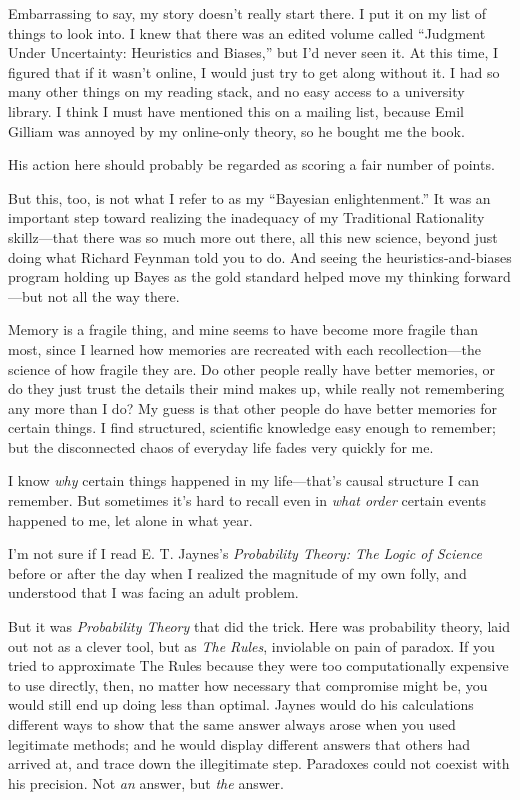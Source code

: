{
 Embarrassing to say, my story doesn't really start
there. I put it on my list of things to look into. I knew that there
was an edited volume called ``Judgment Under
Uncertainty: Heuristics and Biases,'' but
I'd never seen it. At this time, I figured that if it
wasn't online, I would just try to get along without
it. I had so many other things on my reading stack, and no easy access
to a university library. I think I must have mentioned this on a
mailing list, because Emil Gilliam was annoyed by my online-only
theory, so he bought me the book.}

{
 His action here should probably be regarded as scoring a fair
number of points.}

{
 But this, too, is not what I refer to as my
``Bayesian enlightenment.'' It was
an important step toward realizing the inadequacy of my Traditional
Rationality skillz---that there was so much more out there, all this
new science, beyond just doing what Richard Feynman told you to do. And
seeing the heuristics-and-biases program holding up Bayes as the gold
standard helped move my thinking forward---but not all the way there.}

{
 Memory is a fragile thing, and mine seems to have become more
fragile than most, since I learned how memories are recreated with each
recollection---the science of how fragile they are. Do other people
really have better memories, or do they just trust the details their
mind makes up, while really not remembering any more than I do? My
guess is that other people do have better memories for certain things.
I find structured, scientific knowledge easy enough to remember; but
the disconnected chaos of everyday life fades very quickly for me.}

{
 I know \textit{why} certain things happened in my
life---that's causal structure I can remember. But
sometimes it's hard to recall even in \textit{what
order} certain events happened to me, let alone in what year.}

{
 I'm not sure if I read E. T.
Jaynes's \textit{Probability Theory: The Logic of
Science} before or after the day when I realized the magnitude of my
own folly, and understood that I was facing an adult problem.}

{
 But it was \textit{Probability Theory} that did the trick. Here
was probability theory, laid out not as a clever tool, but as
\textit{The Rules}, inviolable on pain of paradox. If you tried to
approximate The Rules because they were too computationally expensive
to use directly, then, no matter how necessary that compromise might
be, you would still end up doing less than optimal. Jaynes would do his
calculations different ways to show that the same answer always arose
when you used legitimate methods; and he would display different
answers that others had arrived at, and trace down the illegitimate
step. Paradoxes could not coexist with his precision. Not \textit{an}
answer, but \textit{the} answer.}

